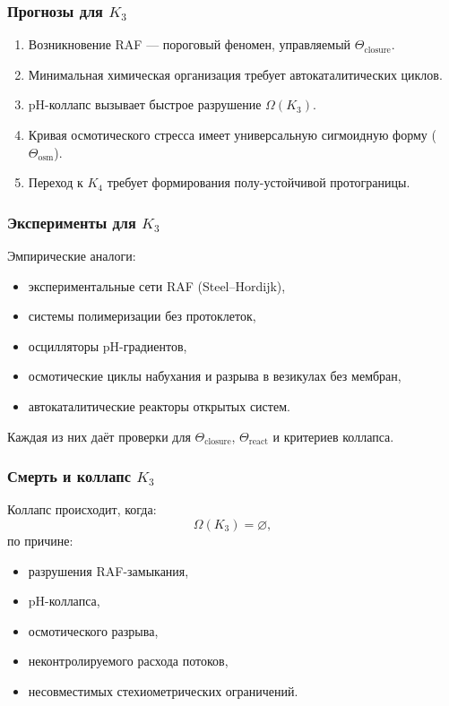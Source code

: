 \subsubsection{Прогнозы для \texorpdfstring{$K_3$}{K_3}}

\begin{enumerate}
    \item Возникновение RAF — пороговый феномен, управляемый
          $\Theta_{\mathrm{closure}}$.
    \item Минимальная химическая организация требует автокаталитических циклов.
    \item pH-коллапс вызывает быстрое разрушение $\Omega(K_3)$.
    \item Кривая осмотического стресса имеет универсальную сигмоидную форму
          ($\Theta_{\mathrm{osm}}$).
    \item Переход к $K_4$ требует формирования полу-устойчивой
          протограницы.
\end{enumerate}

\subsubsection{Эксперименты для \texorpdfstring{$K_3$}{K_3}}

Эмпирические аналоги:
\begin{itemize}
    \item экспериментальные сети RAF (Steel–Hordijk),
    \item системы полимеризации без протоклеток,
    \item осцилляторы pH-градиентов,
    \item осмотические циклы набухания и разрыва в везикулах без мембран,
    \item автокаталитические реакторы открытых систем.
\end{itemize}

Каждая из них даёт проверки для $\Theta_{\mathrm{closure}}$,
$\Theta_{\mathrm{react}}$ и критериев коллапса.

\subsubsection{Смерть и коллапс \texorpdfstring{$K_3$}{K_3}}
\label{sec:k3-collapse}

Коллапс происходит, когда:
\[
\Omega(K_3) = \varnothing,
\]
по причине:
\begin{itemize}
    \item разрушения RAF-замыкания,
    \item pH-коллапса,
    \item осмотического разрыва,
    \item неконтролируемого расхода потоков,
    \item несовместимых стехиометрических ограничений.
\end{itemize}

